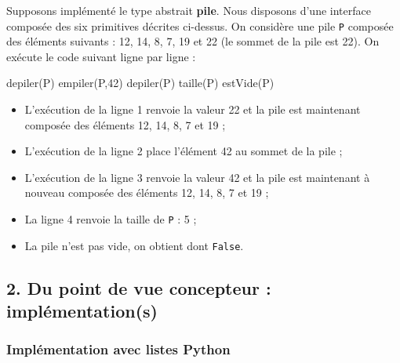 \documentclass[
  a4paper,
  DIV=11,
  numbers=noendperiod]{scrartcl}
\newenvironment{Shaded}{\begin{snugshade}}{\end{snugshade}}
\newcommand{\DecValTok}[1]{\textcolor[rgb]{0.68,0.00,0.00}{#1}}
\newcommand{\NormalTok}[1]{\textcolor[rgb]{0.00,0.23,0.31}{#1}}
\providecommand{\tightlist}{%
  \setlength{\itemsep}{0pt}\setlength{\parskip}{0pt}}\usepackage{longtable,booktabs,array}
\begin{document}
\begin{tcolorbox}[enhanced jigsaw, breakable, coltitle=black, arc=.35mm, opacityback=0, rightrule=.15mm, leftrule=.75mm, opacitybacktitle=0.6, toprule=.15mm, left=2mm, title=\textcolor{quarto-callout-caution-color}{\faFire}\hspace{0.5em}{Exemple}, bottomrule=.15mm, bottomtitle=1mm, toptitle=1mm, titlerule=0mm, colbacktitle=quarto-callout-caution-color!10!white, colback=white]

Supposons implémenté le type abstrait \textbf{pile}. Nous disposons
d'une interface composée des six primitives décrites ci-dessus. On
considère une pile \texttt{P} composée des éléments suivants : 12, 14,
8, 7, 19 et 22 (le sommet de la pile est 22). On exécute le code suivant
ligne par ligne :

\begin{Shaded}
\begin{Highlighting}[numbers=left,,]
\NormalTok{    depiler(P)}
\NormalTok{    empiler(P,}\DecValTok{42}\NormalTok{)}
\NormalTok{    depiler(P)}
\NormalTok{    taille(P)}
\NormalTok{    estVide(P)}
\end{Highlighting}
\end{Shaded}

\begin{itemize}
\tightlist
\item
  L'exécution de la ligne 1 renvoie la valeur 22 et la pile est
  maintenant composée des éléments 12, 14, 8, 7 et 19 ;
\item
  L'exécution de la ligne 2 place l'élément 42 au sommet de la pile ;
\item
  L'exécution de la ligne 3 renvoie la valeur 42 et la pile est
  maintenant à nouveau composée des éléments 12, 14, 8, 7 et 19 ;
\item
  La ligne 4 renvoie la taille de \texttt{P} : 5 ;
\item
  La pile n'est pas vide, on obtient dont \texttt{False}.
\end{itemize}

\end{tcolorbox}

\hypertarget{du-point-de-vue-concepteur-impluxe9mentations}{%
\subsection{2. Du point de vue concepteur :
implémentation(s)}\label{du-point-de-vue-concepteur-impluxe9mentations}}

\hypertarget{impluxe9mentation-avec-listes-python}{%
\subsubsection{Implémentation avec listes
Python}\label{impluxe9mentation-avec-listes-python}}
\end{document}
